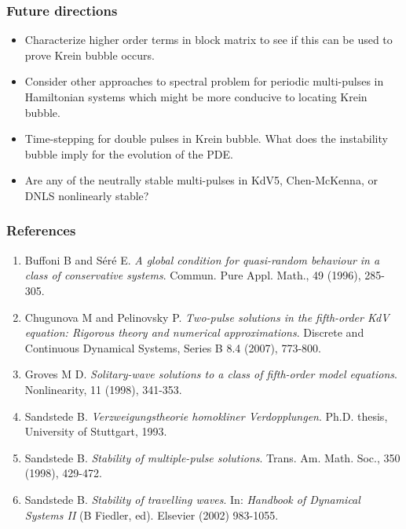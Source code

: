 \documentclass[16pt]{beamer}
\begin{document}
\begin{frame}
	\frametitle{Future directions}
	\fontsize{16}{7.2}\selectfont
	\begin{itemize}
		\item Characterize higher order terms in block matrix to see if this can be used to prove Krein bubble occurs.
		\vspace{0.5cm}
		\item Consider other approaches to spectral problem for periodic multi-pulses in Hamiltonian systems which might be more conducive to locating Krein bubble.
		\vspace{0.5cm}
		\item Time-stepping for double pulses in Krein bubble. What does the instability bubble imply for the evolution of the PDE.
		\vspace{0.5cm}
		\item Are any of the neutrally stable multi-pulses in KdV5, Chen-McKenna, or DNLS nonlinearly stable?
	\end{itemize}
\end{frame}

\begin{frame}
	\frametitle{References}
	\fontsize{12}{7.2}\selectfont
	\begin{enumerate}
		\item Buffoni B and S\'er\'e E. \emph{A global condition for quasi-random behaviour in a class of conservative systems}. Commun. Pure Appl. Math., 49 (1996), 285-305.
		\item Chugunova M and Pelinovsky P. \emph{Two-pulse solutions in the fifth-order KdV equation: Rigorous theory and numerical approximations}. Discrete and Continuous Dynamical Systems, Series B 8.4 (2007), 773-800.
		\item Groves M D. \emph{Solitary-wave solutions to a class of fifth-order model equations}. Nonlinearity, 11 (1998), 341-353.
		\item Sandstede B. \emph{Verzweigungstheorie homokliner Verdopplungen}. Ph.D. thesis, University of Stuttgart, 1993.
		\item Sandstede B. \emph{Stability of multiple-pulse solutions}. Trans. Am. Math. Soc., 350 (1998), 429-472.
		\item Sandstede B. \emph{Stability of travelling waves}. In: \emph{Handbook of Dynamical Systems II} (B Fiedler, ed). Elsevier (2002) 983-1055.
	\end{enumerate}
\end{frame}
 
\end{document}
